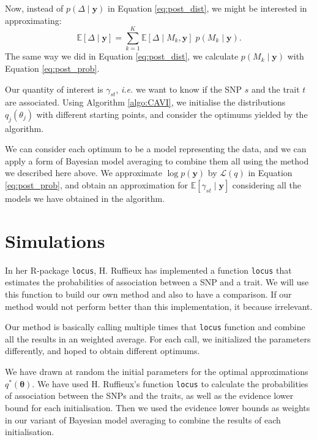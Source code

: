 \documentclass{article}
\numberwithin{equation}{section}
\begin{document}
Now, instead of $p(\Delta \mid \boldsymbol{y})$ in Equation \ref{eq:post_dist}, we might be interested in approximating:
\begin{equation*}
\mathbb{E}\left[\Delta \mid \boldsymbol{y}\right] = \sum_{k=1}^K\mathbb{E}\left[\Delta \mid M_k, \boldsymbol{y}\right]\;p(M_k \mid \boldsymbol{y}).
\end{equation*}
The same way we did in Equation \ref{eq:post_dist}, we calculate $p(M_k \mid \boldsymbol{y})$ with Equation \ref{eq:post_prob}.

Our quantity of interest is $\gamma_{st}$, \textit{i.e.} we want to know if the SNP $s$ and the trait $t$ are associated. Using Algorithm \ref{algo:CAVI}, we initialise the distributions $q_j(\theta_j)$ with different starting points, and consider the optimums yielded by the algorithm.

We can consider each optimum to be a model representing the data, and we can apply a form of Bayesian model averaging to combine them all using the method we described here above. We approximate $\log p(\boldsymbol{y})$ by $\mathcal{L}(q)$ in Equation \ref{eq:post_prob}, and obtain an approximation for $\mathbb{E}\left[\gamma_{st}\mid \boldsymbol{y}\right]$ considering all the models we have obtained in the algorithm.
\newpage
\section{Simulations}
In her R-package \texttt{locus}, H. Ruffieux has implemented a function \texttt{locus} that estimates the probabilities of association between a SNP and a trait. We will use this function to build our own method and also to have a comparison. If our method would not perform better than this implementation, it because irrelevant.

Our method is basically calling multiple times that \texttt{locus} function and combine all the results in an weighted average. For each call, we initialized the parameters differently, and hoped to obtain different optimums.

We have drawn at random the initial parameters for the optimal approximations $q^*(\boldsymbol{\theta})$. We have used H. Ruffieux's function \texttt{locus} to calculate the probabilities of association between the SNPs and the traits, as well as the evidence lower bound for each initialisation. Then we used the evidence lower bounds as weights in our variant of Bayesian model averaging to combine the results of each initialisation.
\end{document}
